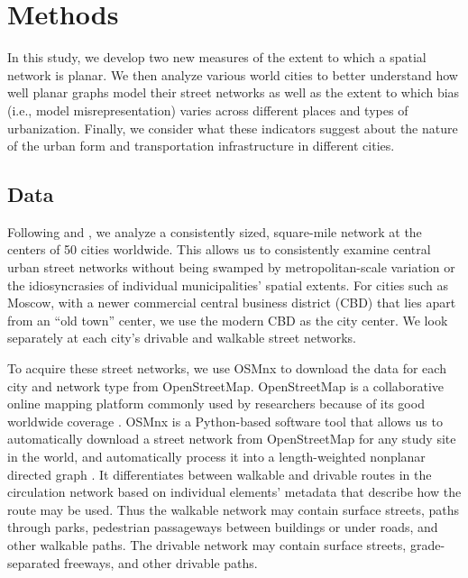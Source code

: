 \documentclass[Afour,sageh,times]{sagej}
\begin{document}
\section{Methods}

In this study, we develop two new measures of the extent to which a spatial network is planar. We then analyze various world cities to better understand how well planar graphs model their street networks as well as the extent to which bias (i.e., model misrepresentation) varies across different places and types of urbanization. Finally, we consider what these indicators suggest about the nature of the urban form and transportation infrastructure in different cities.

\subsection{Data}

Following \citet{jacobs_great_1995} and \citet{cardillo_structural_2006}, we analyze a consistently sized, square-mile network at the centers of 50 cities worldwide. This allows us to consistently examine central urban street networks without being swamped by metropolitan-scale variation or the idiosyncrasies of individual municipalities' spatial extents. For cities such as Moscow, with a newer commercial central business district (CBD) that lies apart from an \enquote{old town} center, we use the modern CBD as the city center. We look separately at each city's drivable and walkable street networks.

To acquire these street networks, we use OSMnx to download the data for each city and network type from OpenStreetMap. OpenStreetMap is a collaborative online mapping platform commonly used by researchers because of its good worldwide coverage \citep{haklay_how_2010,jokar_arsanjani_openstreetmap_2015}. OSMnx is a Python-based software tool that allows us to automatically download a street network from OpenStreetMap for any study site in the world, and automatically process it into a length-weighted nonplanar directed graph \citep{boeing_osmnx:_2017}. It differentiates between walkable and drivable routes in the circulation network based on individual elements' metadata that describe how the route may be used. Thus the walkable network may contain surface streets, paths through parks, pedestrian passageways between buildings or under roads, and other walkable paths. The drivable network may contain surface streets, grade-separated freeways, and other drivable paths.
\end{document}
